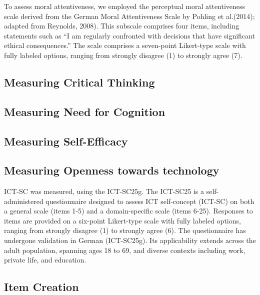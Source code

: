 \documentclass[
  12pt,
  a4paper,
  twoside]{article}
\begin{document}
To assess moral attentiveness, we employed the perceptual moral attentiveness scale derived from the German Moral Attentiveness Scale by Pohling et al.(2014); adapted from Reynolds, 2008). This subscale comprises four items, including statements such as ``I am regularly confronted with decisions that have significant ethical consequences.'' The scale comprises a seven-point Likert-type scale with fully labeled options, ranging from strongly disagree (1) to strongly agree (7).

\hypertarget{measuring-critical-thinking}{%
\subsection{Measuring Critical Thinking}\label{measuring-critical-thinking}}

\hypertarget{measuring-need-for-cognition}{%
\subsection{Measuring Need for Cognition}\label{measuring-need-for-cognition}}

\hypertarget{measuring-self-efficacy}{%
\subsection{Measuring Self-Efficacy}\label{measuring-self-efficacy}}

\hypertarget{measuring-openness-towards-technology}{%
\subsection{Measuring Openness towards technology}\label{measuring-openness-towards-technology}}

ICT-SC was measured, using the ICT-SC25g. The ICT-SC25 is a self-administered questionnaire designed to assess ICT self-concept (ICT-SC) on both a general scale (items 1-5) and a domain-specific scale (items 6-25). Responses to items are provided on a six-point Likert-type scale with fully labeled options, ranging from strongly disagree (1) to strongly agree (6). The questionnaire has undergone validation in German (ICT-SC25g). Its applicability extends across the adult population, spanning ages 18 to 69, and diverse contexts including work, private life, and education.

\hypertarget{item-creation}{%
\subsection{Item Creation}\label{item-creation}}
\end{document}
